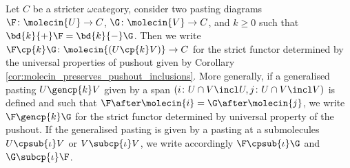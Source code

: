 \begin{dfn} 
    Let \( C \) be a stricter \( \omega \)\nbd category, consider two pasting diagrams \( \F \colon \molecin{U} \to C \), \( \G \colon \molecin{V} \to C \), and \( k \geq 0 \) such that \( \bd{k}{+} \F = \bd{k}{-} \G \).
    Then we write \( \F \cp{k} \G \colon \molecin{(U \cp{k} V)} \to C \) for the strict functor determined by the universal properties of pushout given by Corollary \ref{cor:molecin_preserves_pushout_inclusions}.
    More generally, if a generalised pasting \( U \gencp{k} V \) given by a span \( (i \colon U \cap V \incl U, j \colon U \cap V \incl V) \) is defined and such that \( \F \after \molecin{i} = \G \after \molecin{j} \), we write \( \F \gencp{k} \G \) for the strict functor determined by universal property of the pushout.
    If the generalised pasting is given by a pasting at a submolecules \( U \cpsub{\iota} V \) or \( V \subcp{\iota} V \), we write accordingly \( \F \cpsub{\iota} \G \) and \( \G \subcp{\iota} \F \).
\end{dfn}